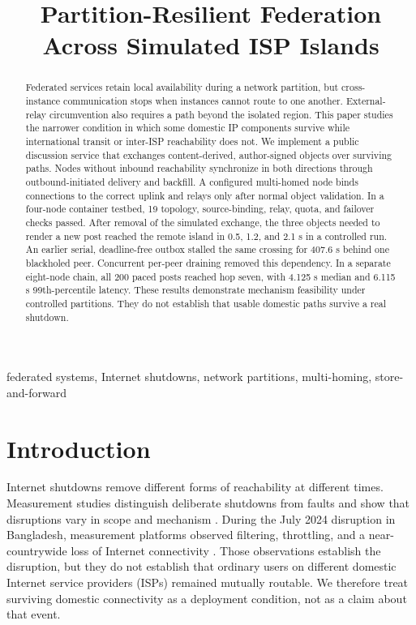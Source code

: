 \documentclass[conference,a4paper]{IEEEtran}
\begin{document}
\title{Partition-Resilient Federation Across Simulated ISP Islands}

\author{}

\maketitle
\vspace{-1.5\baselineskip}

\begin{abstract}
Federated services retain local availability during a network partition, but cross-instance
communication stops when instances cannot route to one another. External-relay circumvention also
requires a path beyond the isolated region. This paper studies the narrower condition in which some
domestic IP components survive while international transit or inter-ISP reachability does not. We
implement a public discussion service that exchanges content-derived, author-signed objects over
surviving paths. Nodes without inbound reachability synchronize in both directions through
outbound-initiated delivery and backfill. A configured multi-homed node binds connections to the
correct uplink and relays only after normal object validation. In a four-node container testbed, 19
topology, source-binding, relay, quota, and failover checks passed. After removal of the simulated
exchange, the three objects needed to render a new post reached the remote island in 0.5, 1.2, and
2.1 s in a controlled run. An earlier serial, deadline-free outbox stalled the same crossing for
407.6 s behind one blackholed peer. Concurrent per-peer draining removed this dependency. In a
separate eight-node chain, all 200 paced posts reached hop seven, with 4.125 s median and 6.115 s
99th-percentile latency. These results demonstrate mechanism feasibility under controlled
partitions. They do not establish that usable domestic paths survive a real shutdown.
\end{abstract}

\begin{IEEEkeywords}
federated systems, Internet shutdowns, network partitions, multi-homing, store-and-forward
\end{IEEEkeywords}

\section{Introduction}

Internet shutdowns remove different forms of reachability at different times. Measurement studies
distinguish deliberate shutdowns from faults and show that disruptions vary in scope and mechanism
\cite{bischof2023shutdowns}. During the July 2024 disruption in Bangladesh, measurement platforms
observed filtering, throttling, and a near-countrywide loss of Internet connectivity
\cite{ooni2025bangladesh}. Those observations establish the disruption, but they do not establish
that ordinary users on different domestic Internet service providers (ISPs) remained mutually
routable. We therefore treat surviving domestic connectivity as a deployment condition, not as a
claim about that event.
\end{document}
